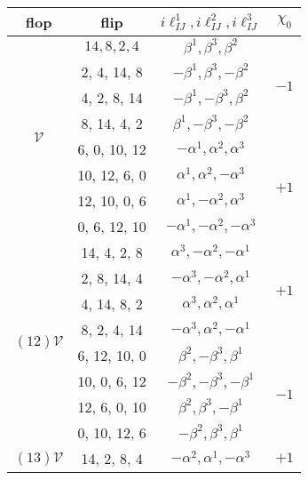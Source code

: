 \begin{table}[!h]
	\label{t:ell}
	\begin{tabular}{|c|c|c|c|}
	\hline
			flop & flip & $i\ell_{IJ}^1, i\ell_{IJ}^2, i\ell_{IJ}^3 $ & $\chi_0$\\
			\hline
			\multirow{8}{*}{$\mathcal{V}$} 
			& $14,8,2,4$ & $ \beta ^1,\beta ^3,\beta ^2 $ & \multirow{4}{*}{$-1$}\\
			\cline{2-3}
			& 2, 4, 14, 8 & $ -\beta ^1,\beta ^3,-\beta ^2$ & \\
			\cline{2-3} 
			&4, 2, 8, 14& $ -\beta ^1,-\beta ^3,\beta ^2 $& \\
			\cline{2-3} 
			&8, 14, 4, 2& $ \beta ^1,-\beta ^3,-\beta ^2$ & \\
			\cline{2-4} 
			&6, 0, 10, 12&  $-\alpha ^1,\alpha ^2,\alpha ^3  $  & \multirow{4}{*}{$+1$} \\
			\cline{2-3} 
			&10, 12, 6, 0& $\alpha ^1,\alpha ^2,-\alpha ^3 $   & \\
			\cline{2-3} 
			&12, 10, 0, 6& $\alpha ^1,-\alpha ^2,\alpha ^3$    & \\
			\cline{2-3} 
			&0, 6, 12, 10& $-\alpha ^1,-\alpha ^2,-\alpha ^3$& \\
			\hline
			\hline
			\multirow{8}{*}{$(12)\mathcal{V}$} & 14, 4, 2, 8 & $\alpha ^3,-\alpha ^2,-\alpha ^1$ & \multirow{4}{*}{$+1$}\\
			\cline{2-3}
			&2, 8, 14, 4& $-\alpha ^3,-\alpha ^2,\alpha ^1$& \\
			\cline{2-3} 
			&4, 14, 8, 2& $\alpha ^3,\alpha ^2,\alpha ^1$& \\
			\cline{2-3} 
			&8, 2, 4, 14&  $-\alpha ^3,\alpha ^2,-\alpha ^1$  & \\
			\cline{2-4} 
			&6, 12, 10, 0& $\beta ^2,-\beta ^3,\beta ^1$   & \multirow{4}{*}{$-1$}\\
			\cline{2-3} 
			&10, 0, 6, 12& $-\beta ^2,-\beta ^3,-\beta ^1$   & \\
			\cline{2-3} 
			&12, 6, 0, 10& $\beta ^2,\beta ^3,-\beta ^1$   & \\
			\cline{2-3} 
			&0, 10, 12, 6& $-\beta ^2,\beta ^3,\beta ^1$& \\
			\hline
			\hline
			\multirow{8}{*}{$(13)\mathcal{V}$} & 14, 2, 8, 4 & $-\alpha ^2,\alpha ^1,-\alpha ^3$& \multirow{4}{*}{$+1$}\\

\end{tabular}
\end{table}
